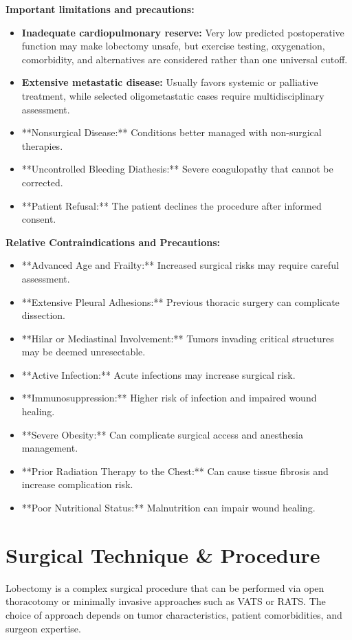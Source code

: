 \textbf{Important limitations and precautions:}
\begin{itemize}
  \item \textbf{Inadequate cardiopulmonary reserve:} Very low predicted postoperative function may make lobectomy unsafe, but exercise testing, oxygenation, comorbidity, and alternatives are considered rather than one universal cutoff.
  \item \textbf{Extensive metastatic disease:} Usually favors systemic or palliative treatment, while selected oligometastatic cases require multidisciplinary assessment.
  \item **Nonsurgical Disease:** Conditions better managed with non-surgical therapies.
  \item **Uncontrolled Bleeding Diathesis:** Severe coagulopathy that cannot be corrected.
  \item **Patient Refusal:** The patient declines the procedure after informed consent.
\end{itemize}

\textbf{Relative Contraindications and Precautions:}
\begin{itemize}
  \item **Advanced Age and Frailty:** Increased surgical risks may require careful assessment.
  \item **Extensive Pleural Adhesions:** Previous thoracic surgery can complicate dissection.
  \item **Hilar or Mediastinal Involvement:** Tumors invading critical structures may be deemed unresectable.
  \item **Active Infection:** Acute infections may increase surgical risk.
  \item **Immunosuppression:** Higher risk of infection and impaired wound healing.
  \item **Severe Obesity:** Can complicate surgical access and anesthesia management.
  \item **Prior Radiation Therapy to the Chest:** Can cause tissue fibrosis and increase complication risk.
  \item **Poor Nutritional Status:** Malnutrition can impair wound healing.
\end{itemize}

\section*{Surgical Technique \& Procedure}
Lobectomy is a complex surgical procedure that can be performed via open thoracotomy or minimally invasive approaches such as VATS or RATS. The choice of approach depends on tumor characteristics, patient comorbidities, and surgeon expertise.


